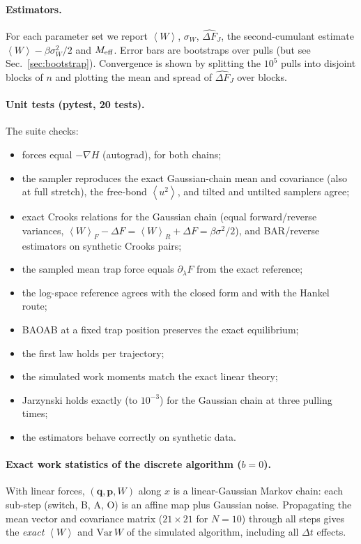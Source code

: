 \documentclass[11pt,a4paper]{article}
\newcommand{\avg}[1]{\left\langle #1\right\rangle}
\newcommand{\dFJ}{\widehat{\Delta F}_J}
\begin{document}
\paragraph{Estimators.} For each parameter set we report $\avg W$, $\sigma_W$, $\dFJ$, the
second-cumulant estimate $\avg W-\beta\sigma_W^2/2$ and $M_{\rm eff}$. Error bars are bootstraps
over pulls (but see Sec.~\ref{sec:bootstrap}). Convergence is shown by splitting the $10^5$
pulls into disjoint blocks of $n$ and plotting the mean and spread of $\dFJ$ over blocks.

\paragraph{Unit tests (pytest, 20 tests).} The suite checks:
\begin{itemize}[leftmargin=*,itemsep=0pt]
\item forces equal $-\nabla H$ (autograd), for both chains;
\item the sampler reproduces the exact Gaussian-chain mean and covariance (also at full stretch),
the free-bond $\avg{u^2}$, and tilted and untilted samplers agree;
\item exact Crooks relations for the Gaussian chain (equal forward/reverse variances,
$\avg W_F-\Delta F=\avg W_R+\Delta F=\beta\sigma^2/2$), and BAR/reverse estimators on synthetic Crooks pairs;
\item the sampled mean trap force equals $\partial_\lambda F$ from the exact reference;
\item the log-space reference agrees with the closed form and with the Hankel route;
\item BAOAB at a fixed trap position preserves the exact equilibrium;
\item the first law holds per trajectory;
\item the simulated work moments match the exact linear theory;
\item Jarzynski holds exactly (to $10^{-3}$) for the Gaussian chain at three pulling times;
\item the estimators behave correctly on synthetic data.
\end{itemize}

\paragraph{Exact work statistics of the discrete algorithm ($b=0$).} With linear forces,
$(\bm q,\bm p,W)$ along $x$ is a linear-Gaussian Markov chain: each sub-step (switch, B, A, O)
is an affine map plus Gaussian noise. Propagating the mean vector and covariance matrix
($21\times21$ for $N=10$) through all steps gives the \emph{exact} $\avg W$ and $\mathrm{Var}\,W$
of the simulated algorithm, including all $\Delta t$ effects.
\end{document}
